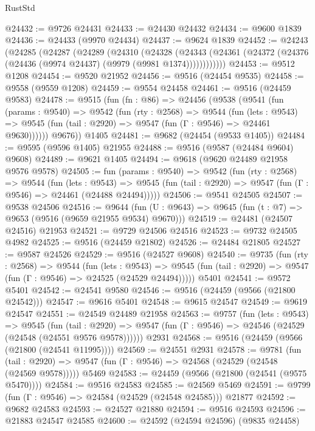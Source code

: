 \begin{lexlean}{RustStd}
\begin{coremodule}
@24432 := @9726 @24431
@24433 := @24430 @24432
@24434 := @9600 @1839
@24436 := @24433 (@9970 @24434)
@24437 := @9624 @1839
@24452 := @24243
    (@24285
      (@24287
        (@24289
          (@24310
            (@24328
              (@24343 (@24361 (@24372 (@24376 (@24436 (@9974 @24437) (@9979 (@9981 @1374))))))))))))
@24453 := @9512 @1208
@24454 := @9520 @21952
@24456 := @9516 (@24454 @9535)
@24458 := @9558 (@9559 @1208)
@24459 := @9554 @24458
@24461 := @9516 (@24459 @9583)
@24478 := @9515
    (fun (fn : @86) =>
    @24456
      (@9538
        (@9541
          (fun (params : @9540) =>
          @9542
            (fun (rty : @2568) =>
            @9544
              (fun (lets : @9543) =>
              @9545 (fun (tail : @2920) => @9547 (fun (Γ : @9546) => @24461 @9630))))))
        @9676))
    @1405
@24481 := @9682 (@24454 (@9533 @1405))
@24484 := @9595 (@9596 @1405) @21955
@24488 := @9516 (@9587 (@24484 @9604) @9608)
@24489 := @9621 @1405
@24494 := @9618 (@9620 @24489 @21958 @9576 @9578)
@24505 := fun (params : @9540) =>
  @9542
    (fun (rty : @2568) =>
    @9544
      (fun (lets : @9543) =>
      @9545 (fun (tail : @2920) => @9547 (fun (Γ : @9546) => @24461 (@24488 @24494)))))
@24506 := @9541 @24505
@24507 := @9538 @24506
@24516 := @9644
    (fun (U : @9643) => @9645 (fun (t : @7) => @9653 (@9516 (@9659 @21955 @9534) @9670)))
@24519 := @24481 (@24507 @24516) @21953
@24521 := @9729 @24506 @24516
@24523 := @9732 @24505 @4982
@24525 := @9516 (@24459 @21802)
@24526 := @24484 @21805
@24527 := @9587 @24526
@24529 := @9516 (@24527 @9608)
@24540 := @9735
    (fun (rty : @2568) =>
    @9544
      (fun (lets : @9543) =>
      @9545 (fun (tail : @2920) => @9547 (fun (Γ : @9546) => @24525 (@24529 @24494)))))
    @5401
@24541 := @9572 @5401
@24542 := @24541 @9580
@24546 := @9516 (@24459 (@9566 (@21800 @24542)))
@24547 := @9616 @5401
@24548 := @9615 @24547
@24549 := @9619 @24547
@24551 := @24549 @24489 @21958
@24563 := @9757
    (fun (lets : @9543) =>
    @9545
      (fun (tail : @2920) =>
      @9547 (fun (Γ : @9546) => @24546 (@24529 (@24548 (@24551 @9576 @9578))))))
    @2931
@24568 := @9516 (@24459 (@9566 (@21800 (@24541 @11995))))
@24569 := @24551 @2931
@24578 := @9781
    (fun (tail : @2920) => @9547 (fun (Γ : @9546) => @24568 (@24529 (@24548 (@24569 @9578)))))
    @5469
@24583 := @24459 (@9566 (@21800 (@24541 (@9575 @5470))))
@24584 := @9516 @24583
@24585 := @24569 @5469
@24591 := @9799 (fun (Γ : @9546) => @24584 (@24529 (@24548 @24585))) @21877
@24592 := @9682 @24583
@24593 := @24527 @21880
@24594 := @9516 @24593
@24596 := @21883 @24547 @24585
@24600 := @24592 (@24594 @24596) (@9835 @24458)

\end{coremodule}
\end{lexlean}
